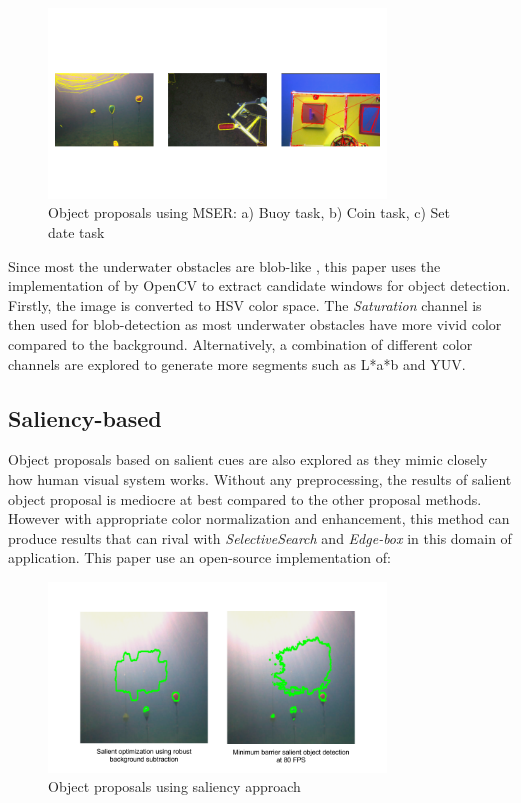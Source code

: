 \documentclass[fypca]{socreport}
\begin{document}
\begin{figure}[H]
\centering
  \includegraphics[width=0.8\textwidth, height=0.3\textheight]{mserproposal.png}
  \caption{Object proposals using MSER: a) Buoy task, b) Coin task, c) Set date task}
  \label{fig:mser_proposal}
\end{figure}

Since most the underwater obstacles are blob-like , this paper uses the
implementation of  by OpenCV to extract candidate
windows for object detection. Firstly, the image is converted to HSV color
space. The \textit{Saturation} channel is then used for blob-detection as most
underwater obstacles have more vivid color compared to the background.
Alternatively, a combination of different color channels are explored to
generate more segments such as L*a*b and YUV.

\subsection{Saliency-based}

Object proposals based on salient cues are also explored as they mimic closely
how human visual system works. Without any preprocessing, the results of salient
object proposal is mediocre at best compared to the other proposal methods.
However with appropriate color normalization and enhancement, this method can
produce results that can rival with \textit{SelectiveSearch} and
\textit{Edge-box} in this domain of application. This paper use an open-source implementation of:

\begin{figure}[H]
\centering
  \includegraphics[width=0.8\textwidth, height=0.3\textheight]{saliency.png}
  \caption{Object proposals using saliency approach}
  \label{fig:salient_proposal}
\end{figure}
\end{document}
